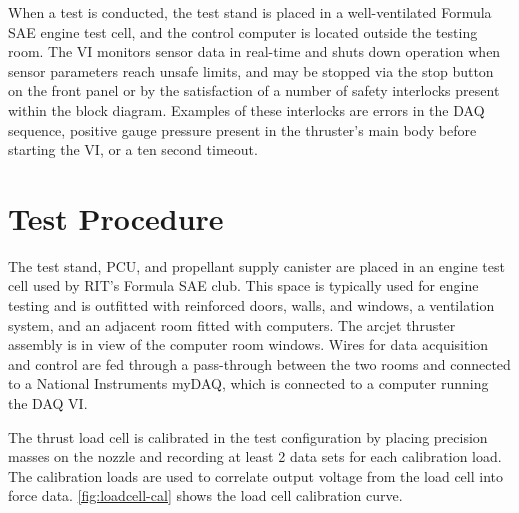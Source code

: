 \documentclass[journal]{IEEEtran}
\begin{document}
When a test is conducted, the test stand is placed in a well-ventilated Formula SAE engine test cell, and the control computer is located outside the testing room.
The VI monitors sensor data in real-time and shuts down operation when sensor parameters reach unsafe limits, and may be stopped via the stop button on the front panel or by the satisfaction of a number of safety interlocks present within the block diagram.
Examples of these interlocks are errors in the DAQ sequence, positive gauge pressure present in the thruster's main body before starting the VI, or a ten second timeout.


\section{Test Procedure}
The test stand, PCU, and propellant supply canister are placed in an engine test cell used by RIT's Formula SAE club.
This space is typically used for engine testing and is outfitted with reinforced doors, walls, and windows, a ventilation system, and an adjacent room fitted with computers.
The arcjet thruster assembly is in view of the computer room windows.
Wires for data acquisition and control are fed through a pass-through between the two rooms and connected to a National Instruments myDAQ, which is connected to a computer running the DAQ VI.\@

The thrust load cell is calibrated in the test configuration by placing precision masses on the nozzle and recording at least 2 data sets for each calibration load.
The calibration loads are used to correlate output voltage from the load cell into force data. \autoref{fig:loadcell-cal} shows the load cell calibration curve.
\end{document}
